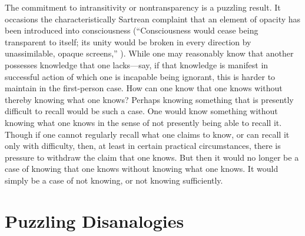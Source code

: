 The commitment to intransitivity or nontransparency is a puzzling result. It occasions the characteristically Sartrean complaint that an element of opacity has been introduced into consciousness (``Consciousness would cease being transparent to itself; its unity would be broken in every direction by unassimilable, opaque screens,'' \citealt[6]{Sartre:1948aa}). While one may reasonably know that another possesses knowledge that one lacks—say, if that knowledge is manifest in successful action of which one is incapable being ignorant, this is harder to maintain in the first-person case. How can one know that one knows without thereby knowing what one knows? Perhaps knowing something that is presently difficult to recall would be such a case. One would know something without knowing what one knows in the sense of not presently being able to recall it. Though if one cannot regularly recall what one claims to know, or can recall it only with difficulty, then, at least in certain practical circumstances, there is pressure to withdraw the claim that one knows. But then it would no longer be a case of knowing that one knows without knowing what one knows. It would simply be a case of not knowing, or not knowing sufficiently.



\section{Puzzling Disanalogies} %
\label{sec:puzzling_disanalogies}

